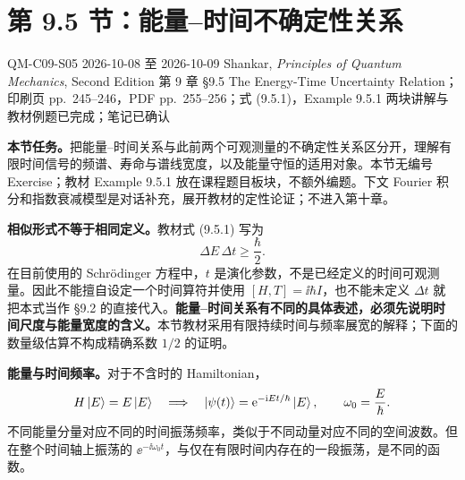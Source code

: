 \section{第 9.5 节：能量--时间不确定性关系}
\label{section:QM-C09-S05}
\studymeta
  {QM-C09-S05}
  {2026-10-08 至 2026-10-09}
  {Shankar, \textit{Principles of Quantum Mechanics}, Second Edition}
  {第 9 章 \S 9.5 The Energy-Time Uncertainty Relation；印刷页 pp.~245--246，PDF pp.~255--256；式 (9.5.1)，Example 9.5.1}
  {两块讲解与教材例题已完成；笔记已确认}

\textbf{本节任务。}把能量--时间关系与此前两个可观测量的不确定性关系区分开，理解有限时间信号的频谱、寿命与谱线宽度，以及能量守恒的适用对象。本节无编号 Exercise；教材 Example 9.5.1 放在课程题目板块，不额外编题。下文 Fourier 积分和指数衰减模型是对话补充，展开教材的定性论证；不进入第十章。

\textbf{相似形式不等于相同定义。}教材式 (9.5.1) 写为
\begin{equation}
  \Delta E\,\Delta t\ge\frac{\hbar}{2}.
\end{equation}
在目前使用的 Schr\"odinger 方程中，$t$ 是演化参数，不是已经定义的时间可观测量。因此不能擅自设定一个时间算符并使用 $[H,T]=\ii\hbar I$，也不能未定义 $\Delta t$ 就把本式当作 \S 9.2 的直接代入。\textbf{能量--时间关系有不同的具体表述，必须先说明时间尺度与能量宽度的含义。}本节教材采用有限持续时间与频率展宽的解释；下面的数量级估算不构成精确系数 $1/2$ 的证明。

\textbf{能量与时间频率。}对于不含时的 Hamiltonian，
\begin{equation}
  H\left|E\right\rangle=E\left|E\right\rangle
  \quad\Longrightarrow\quad
  \left|\psi(t)\right\rangle=\mathrm{e}^{-\mathrm{i} Et/\hbar}\left|E\right\rangle,
  \qquad \omega_0=\frac E\hbar.
\end{equation}
不同能量分量对应不同的时间振荡频率，类似于不同动量对应不同的空间波数。但在整个时间轴上振荡的 $\ee^{-\ii\omega_0t}$，与仅在有限时间内存在的一段振荡，是不同的函数。

